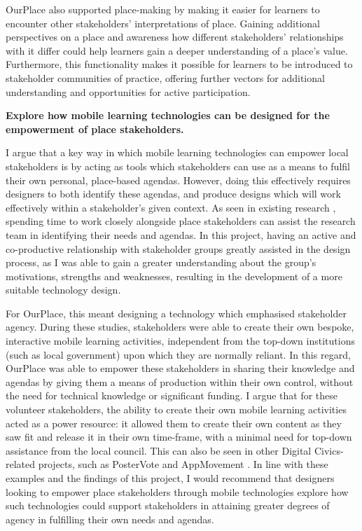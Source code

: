OurPlace also supported place-making by making it easier for learners to encounter other stakeholders' interpretations of place. Gaining additional perspectives on a place and awareness how different stakeholders' relationships with it differ could help learners gain a deeper understanding of a place's value. Furthermore, this functionality makes it possible for learners to be introduced to stakeholder communities of practice, offering further vectors for additional understanding and opportunities for active participation.

\begin{displayquote}
\textbf{Explore how mobile learning technologies can be designed for the empowerment of place stakeholders.}
\end{displayquote}

I argue that a key way in which mobile learning technologies can empower local stakeholders is by acting as tools which stakeholders can use as a means to fulfil their own personal, place-based agendas. However, doing this effectively requires designers to both identify these agendas, and produce designs which will work effectively within a stakeholder's given context. As seen in existing research \citep{Fox2014, Crivellaro2016}, spending time to work closely alongside place stakeholders can assist the research team in identifying their needs and agendas. In this project, having an active and co-productive relationship with stakeholder groups greatly assisted in the design process, as I was able to gain a greater understanding about the group's motivations, strengths and weaknesses, resulting in the development of a more suitable technology design. 

For OurPlace, this meant designing a technology which emphasised stakeholder agency. During these studies, stakeholders were able to create their own bespoke, interactive mobile learning activities, independent from the top-down institutions (such as local government) upon which they are normally reliant. In this regard, OurPlace was able to empower these stakeholders in sharing their knowledge and agendas by giving them a means of production within their own control, without the need for technical knowledge or significant funding. I argue that for these volunteer stakeholders, the ability to create their own mobile learning activities acted as a power resource: it allowed them to create their own content as they saw fit and release it in their own time-frame, with a minimal need for top-down assistance from the local council. This can also be seen in other Digital Civics-related projects, such as PosterVote \citep{Vlachokyriakos2014} and AppMovement \citep{Garbett2016}. In line with these examples and the findings of this project, I would recommend that designers looking to empower place stakeholders through mobile technologies explore how such technologies could support stakeholders in attaining greater degrees of agency in fulfilling their own needs and agendas.


